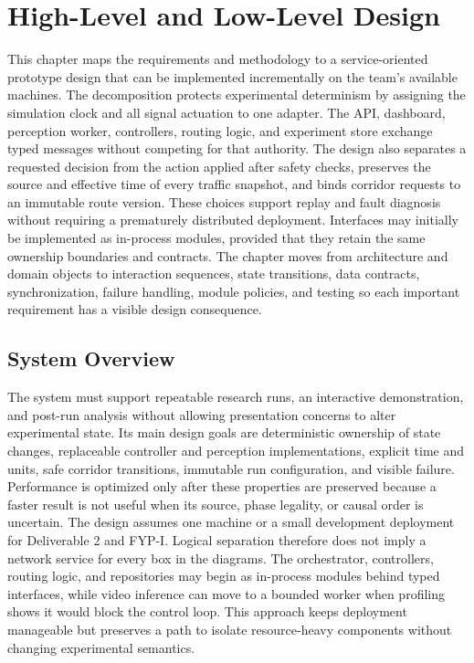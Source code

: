 \chapter{High-Level and Low-Level Design}
\label{ch:design}

This chapter maps the requirements and methodology to a service-oriented prototype design that can be implemented incrementally on the team's available machines. The decomposition protects experimental determinism by assigning the simulation clock and all signal actuation to one adapter. The API, dashboard, perception worker, controllers, routing logic, and experiment store exchange typed messages without competing for that authority. The design also separates a requested decision from the action applied after safety checks, preserves the source and effective time of every traffic snapshot, and binds corridor requests to an immutable route version. These choices support replay and fault diagnosis without requiring a prematurely distributed deployment. Interfaces may initially be implemented as in-process modules, provided that they retain the same ownership boundaries and contracts. The chapter moves from architecture and domain objects to interaction sequences, state transitions, data contracts, synchronization, failure handling, module policies, and testing so each important requirement has a visible design consequence.

\section{System Overview}

The system must support repeatable research runs, an interactive demonstration, and post-run analysis without allowing presentation concerns to alter experimental state. Its main design goals are deterministic ownership of state changes, replaceable controller and perception implementations, explicit time and units, safe corridor transitions, immutable run configuration, and visible failure. Performance is optimized only after these properties are preserved because a faster result is not useful when its source, phase legality, or causal order is uncertain. The design assumes one machine or a small development deployment for Deliverable 2 and FYP-I. Logical separation therefore does not imply a network service for every box in the diagrams. The orchestrator, controllers, routing logic, and repositories may begin as in-process modules behind typed interfaces, while video inference can move to a bounded worker when profiling shows it would block the control loop. This approach keeps deployment manageable but preserves a path to isolate resource-heavy components without changing experimental semantics.

